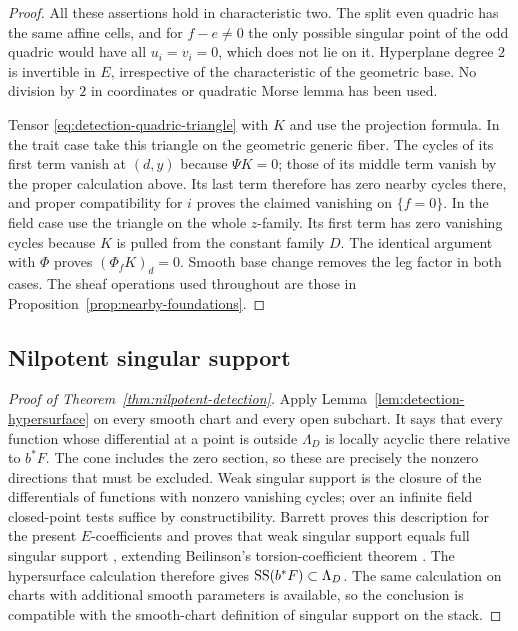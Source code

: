 \begin{proof}
All these assertions hold in characteristic two.  The split even quadric
has the same affine cells, and for $f-e\ne0$ the only possible singular
point of the odd quadric would have all $u_i=v_i=0$, which does not
lie on it.  Hyperplane degree $2$ is invertible in $E$, irrespective of
the characteristic of the geometric base.  No division by $2$ in
coordinates or quadratic Morse lemma has been used.

Tensor \eqref{eq:detection-quadric-triangle} with $K$ and use the
projection formula.  In the trait case take this triangle on the
geometric generic fiber.  The cycles of its first term vanish at
$(d,y)$ because $\Psi K=0$; those of its middle term vanish by the
proper calculation above.  Its last term therefore has zero nearby
cycles there, and proper compatibility for $i$ proves the claimed
vanishing on $\{f=0\}$.  In the field case use the triangle on the
whole $z$-family.  Its first term has zero vanishing cycles because
$K$ is pulled from the constant family $D$.  The identical argument
with $\Phi$ proves $(\Phi_f K)_d=0$.  Smooth base change removes the
leg factor in both cases.  The sheaf operations used throughout are
those in Proposition~\ref{prop:nearby-foundations}.
\end{proof}

\subsection{Nilpotent singular support}

\begin{proof}[Proof of Theorem~\ref{thm:nilpotent-detection}]
Apply Lemma~\ref{lem:detection-hypersurface} on every smooth chart and
every open subchart.  It says that every function whose differential
at a point is outside $\Lambda_D$ is locally acyclic there relative to
$b^*F$.  The cone includes the zero section, so these are precisely the
nonzero directions that must be excluded.  Weak singular support is
the closure of the differentials of functions with nonzero vanishing
cycles; over an infinite field closed-point tests suffice by
constructibility.  Barrett proves this description for the present
$E$-coefficients and proves that weak singular support equals full
singular support \cite[\S\S1.4--1.5, Theorem~(vii)]{Barrett}, extending
Beilinson's torsion-coefficient theorem \cite[\S1.5]{Beilinson}.
The hypersurface calculation therefore gives
$\operatorname{SS}(b^*F)\subset\Lambda_D$.  The same calculation on charts with
additional smooth parameters is available, so the conclusion is
compatible with the smooth-chart definition of singular support on
the stack.
\end{proof}

